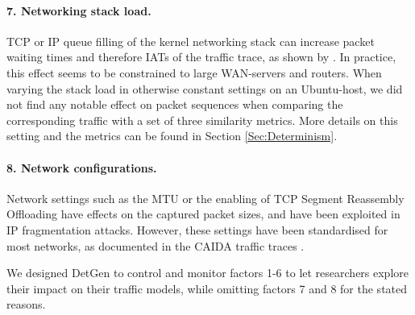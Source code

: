 \documentclass[runningheads]{llncs}
\begin{document}
\paragraph{7. Networking stack load.}
TCP or IP queue filling of the kernel networking stack can increase packet waiting times and therefore IATs of the traffic trace, as shown by \cite{sequeira2013influence}. In practice, this effect seems to be constrained to large WAN-servers and routers. When varying the stack load in otherwise constant settings on an Ubuntu-host, we did not find any notable effect on packet sequences when comparing the corresponding traffic with a set of three similarity metrics. More details on this setting and the metrics can be found in Section \ref{Sec:Determinism}.




\paragraph{8. Network configurations.}
Network settings such as the MTU or the enabling of TCP Segment Reassembly Offloading have effects on the captured packet sizes, and have been exploited in IP fragmentation attacks. However, these settings have been standardised for most networks, as documented in the CAIDA traffic traces \cite{walsworth2015caida}.




\vspace{0.3cm}
We designed DetGen to control and monitor factors 1-6 to let researchers explore their impact on their traffic models, while omitting factors 7 and 8 for the stated reasons.
\end{document}
